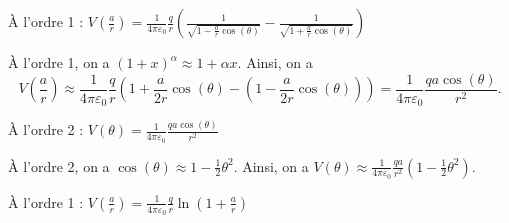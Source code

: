 
\begin{enonce}
	À l'ordre 1 : $V\left(\frac{a}{r}\right) = \frac{1}{4\pi\varepsilon_0} \frac{q}{r} \left( \frac{1}{\sqrt{ 1 - \frac{a}{r} \cos (\theta)  }} - \frac{1}{\sqrt{ 1 + \frac{a}{r} \cos (\theta)  }} \right)$
\end{enonce}


\begin{corrige}
	À l'ordre 1, on a $\left(1+x\right)^{\alpha} \approx  1 + \alpha x$. Ainsi, on a
	\[
		V\left(\frac{a}{r}\right) \approx \frac{1}{4\pi\varepsilon_0} \frac{q}{r} \left( 1  + \frac{a}{2r} \cos (\theta)  - \left( 1 -  \frac{a}{2r} \cos (\theta)  \right) \right) = \frac{1}{4\pi\varepsilon_0} \frac{qa\cos (\theta)}{r^2}.
	\]
\end{corrige}






\begin{enonce}
	À l'ordre 2 : $V\left(\theta\right) = \frac{1}{4\pi\varepsilon_0} \frac{qa\cos (\theta) }{r^2}$
\end{enonce}


\begin{corrige}
	À l'ordre 2, on a  $\cos(\theta) \approx  1 - \frac{1}{2}\theta^2$. Ainsi, on a 
	$
		V\left(\theta\right) \approx \frac{1}{4\pi\varepsilon_0} \frac{qa}{r^2}\left(1 - \frac{1}{2}\theta^2\right)
	$.
\end{corrige}






\begin{enonce}
	À l'ordre 1 : $V\left(\frac{a}{r}\right) = \frac{1}{4\pi\varepsilon_0} \frac{q}{r} \ln \left( 1 + \frac{a}{r} \right)$
\end{enonce}

